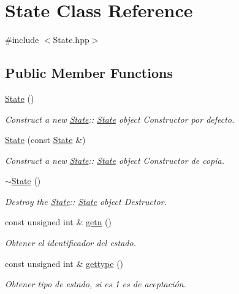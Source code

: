 \hypertarget{class_state}{}\section{State Class Reference}
\label{class_state}


{\ttfamily \#include $<$State.\+hpp$>$}

\subsection*{Public Member Functions}
\begin{DoxyCompactItemize}
\item 
\hyperlink{class_state_ab91bb1dd5aa6260ab2a456581daf9ec2}{State} ()
\begin{DoxyCompactList}\small\item\em Construct a new \hyperlink{class_state}{State}\+:\+: \hyperlink{class_state}{State} object Constructor por defecto. \end{DoxyCompactList}\item 
\hyperlink{class_state_a5ca97340266d486dfa42225f19c40de3}{State} (const \hyperlink{class_state}{State} \&)
\begin{DoxyCompactList}\small\item\em Construct a new \hyperlink{class_state}{State}\+:\+: \hyperlink{class_state}{State} object Constructor de copia. \end{DoxyCompactList}\item 
\hyperlink{class_state_afab438d92b90dc18d194dbd9c9c8bab3}{$\sim$\+State} ()
\begin{DoxyCompactList}\small\item\em Destroy the \hyperlink{class_state}{State}\+:\+: \hyperlink{class_state}{State} object Destructor. \end{DoxyCompactList}\item 
const unsigned int \& \hyperlink{class_state_ac045d201c81b6ea1ff3da734c6e286a7}{getn} ()
\begin{DoxyCompactList}\small\item\em Obtener el identificador del estado. \end{DoxyCompactList}\item 
const unsigned int \& \hyperlink{class_state_ad701488d3ba934847dcea6222d65719e}{gettype} ()
\begin{DoxyCompactList}\small\item\em Obtener tipo de estado, si es 1 es de aceptación. \end{DoxyCompactList}\item 

\end{DoxyCompactItemize}
